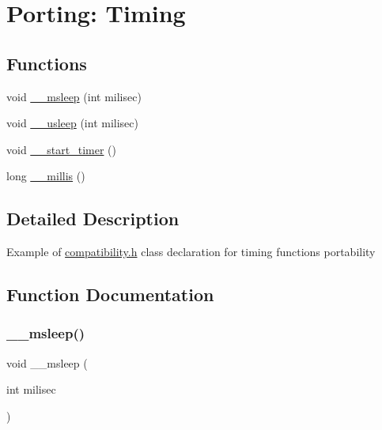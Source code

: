 \hypertarget{group__Porting__Timing}{}\section{Porting\+: Timing}
\label{group__Porting__Timing}
\subsection*{Functions}
\begin{DoxyCompactItemize}
\item 
void \hyperlink{group__Porting__Timing_ga4c2e4dffa20576f5b3d9c2f9bb052106}{\+\_\+\+\_\+msleep} (int milisec)
\item 
void \hyperlink{group__Porting__Timing_gaec87320f2886551c012814de85713681}{\+\_\+\+\_\+usleep} (int milisec)
\item 
void \hyperlink{group__Porting__Timing_ga6c8e606d2db30ac66d24b35056a8f819}{\+\_\+\+\_\+start\+\_\+timer} ()
\item 
long \hyperlink{group__Porting__Timing_gad13c7acd564917af4f86b655035a6424}{\+\_\+\+\_\+millis} ()
\end{DoxyCompactItemize}


\subsection{Detailed Description}
Example of \hyperlink{compatibility_8h}{compatibility.\+h} class declaration for timing functions portability 

\subsection{Function Documentation}
\mbox{\label{group__Porting__Timing_ga4c2e4dffa20576f5b3d9c2f9bb052106}} 
\subsubsection{\texorpdfstring{\+\_\+\+\_\+msleep()}{\_\_msleep()}}
{\footnotesize\ttfamily void \+\_\+\+\_\+msleep (\begin{DoxyParamCaption}\item[{int}]{milisec }\end{DoxyParamCaption})}

